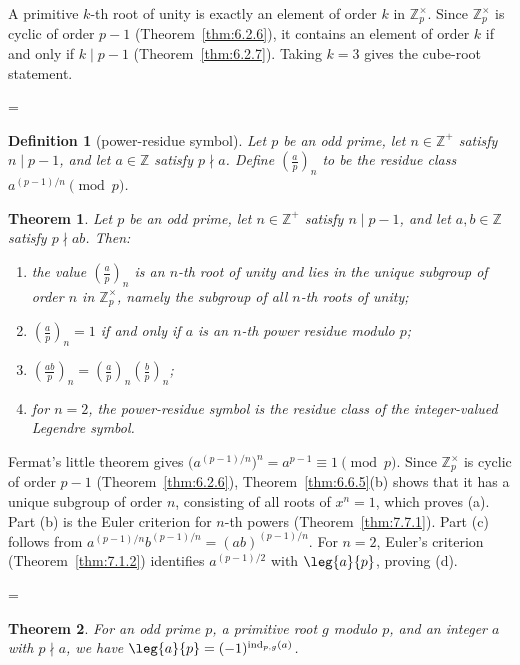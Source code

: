 \documentclass[11pt]{article}
\makeatletter
\theoremstyle{ntstyle}
\newtheorem{theorem}{Theorem}[subsection]
\newtheorem{definition}{Definition}[subsection]
\let\nt@closedisplay\]
\def\nt@guardedclose{\@ifnextchar\par{\nt@closeafterpar}{\@ifnextchar\end{\postdisplaypenalty\@M\nt@closedisplay}{\nt@closedisplay}}}
\def\nt@closeafterpar\par{\@ifnextchar\par{\nt@closeafterpar}{\@ifnextchar\end{\postdisplaypenalty\@M\nt@closedisplay\par}{\nt@closedisplay\par}}}
\renewenvironment{proof}[1][\proofname]{\par
  \pushQED{\qed}\normalfont\topsep\medskipamount\edef\nt@afterproof{\@endparpenalty=\the\@endparpenalty\relax}\@beginparpenalty\@M\@endparpenalty\@M\let\]\nt@guardedclose\trivlist\item[]\textit{#1\@addpunct{.}} \ignorespaces}{\ifvmode\addpenalty\@M\fi\popQED\nt@afterproof\endtrivlist\@endpefalse}
\newcommand{\pleg}[3]{\left(\frac{#1}{#2}\right)_{#3}}
\newcommand{\ZmodUnits}[1]{\mathbb{Z}_{#1}^{\times}}
\DeclareMathOperator{\ind}{ind}
\makeatother
\begin{document}
\begin{proof} A primitive $k$-th root of unity is exactly
	an element of order $k$ in $\ZmodUnits{p}$. Since
	$\ZmodUnits{p}$ is cyclic of order $p-1$ (Theorem~\ref{thm:6.2.6}), it
	contains
	an element of order $k$ if and only if $k \mid p-1$ (Theorem~\ref{thm:6.2.7}). Taking $k
		= 3$ gives the cube-root statement.


\end{proof}
\begin{definition}[power-residue symbol]\label{def:7.7.5} Let $p$
	be an odd prime, let $n\in\mathbb{Z}^+$ satisfy $n\mid p-1$, and let
	$a\in\mathbb{Z}$ satisfy $p\nmid a$. Define $\pleg{a}{p}{n}$
	to be the residue class $a^{(p-1)/n}\pmod{p}$.

\end{definition}
\begin{theorem}\label{thm:7.7.3} Let $p$ be an odd prime, let $n\in\mathbb{Z}^+$
	satisfy $n\mid p-1$, and let $a,b\in\mathbb{Z}$ satisfy $p\nmid ab$.
	Then:
	\begin{enumerate}[label={\alph*)}]
		\item the value $\pleg{a}{p}{n}$ is an $n$-th root of unity and lies
		      in the unique subgroup of order $n$ in $\ZmodUnits{p}$, namely
		      the subgroup of all $n$-th roots of unity;
		\item $\pleg{a}{p}{n}=1$ if and only if $a$ is an $n$-th power
		      residue modulo $p$;
		\item $\pleg{ab}{p}{n}=\pleg{a}{p}{n}\pleg{b}{p}{n}$;
		\item for $n=2$, the power-residue symbol is the residue class of the integer-valued Legendre symbol.
	\end{enumerate}

\end{theorem}

\begin{proof} Fermat's little theorem gives
	$\big(a^{(p-1)/n}\big)^n=a^{p-1}\equiv1\pmod{p}$. Since
	$\ZmodUnits{p}$ is cyclic of order $p-1$ (Theorem~\ref{thm:6.2.6}), Theorem~\ref{thm:6.6.5}(b) shows that it has a unique
	subgroup of order $n$, consisting of all roots of $x^n=1$, which proves
	(a). Part (b) is the Euler criterion for $n$-th powers (Theorem~\ref{thm:7.7.1}). Part (c) follows from
	$a^{(p-1)/n}b^{(p-1)/n}=(ab)^{(p-1)/n}$. For $n=2$, Euler's criterion
	(Theorem~\ref{thm:7.1.2}) identifies $a^{(p-1)/2}$ with $\leg{a}{p}$, proving
	(d).

\end{proof}
\begin{theorem}\label{thm:7.7.4} For an odd
	prime $p$, a primitive root $g$ modulo $p$, and an integer $a$ with $p
		\nmid a$, we have $\leg{a}{p} = (-1)^{\ind_{p,g}(a)}$.

\end{theorem}
\end{document}
